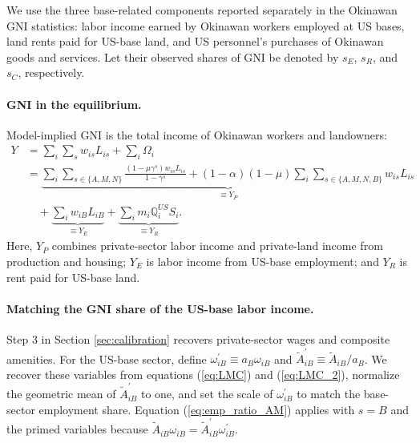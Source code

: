 \documentclass[12pt, unicode, a4paper]{article}
\newcommand{\1}{\mbox{1}\hspace{-0.25em}\mbox{l}} %
\begin{document}
We use the three base-related components reported separately in the Okinawan GNI statistics: labor income earned by Okinawan workers employed at US bases, land rents paid for US-base land, and US personnel's purchases of Okinawan goods and services. Let their observed shares of GNI be denoted by $s_E$, $s_R$, and $s_C$, respectively.

\paragraph{GNI in the equilibrium.}

Model-implied GNI is the total income of Okinawan workers and landowners:
\begin{equation*}
    \begin{split}
    Y &= \sum_i \sum_s w_{is}L_{is}+\sum_i \Omega_i\\
    &= \underbrace{\sum_i \sum_{s \in \{ A,M,N \}} \frac{(1-\mu\gamma^s)w_{is}L_{is}}{1-\gamma^s}+(1-\alpha)(1-\mu)\sum_i \sum_{s \in \{ A,M,N,B \}} w_{is}L_{is}}_{\equiv Y_P}\\
    &\quad +\underbrace{\sum_i w_{iB}L_{iB}}_{\equiv Y_E}+\underbrace{\sum_i m_i\mathbb{Q}_i^{US}S_i}_{\equiv Y_R} .
    \end{split}
\end{equation*}
Here, $Y_P$ combines private-sector labor income and private-land income from production and housing; $Y_E$ is labor income from US-base employment; and $Y_R$ is rent paid for US-base land.

\paragraph{Matching the GNI share of the US-base labor income.}

Step 3 in Section \ref{sec:calibration} recovers private-sector wages and composite amenities. For the US-base sector, define $\omega_{iB}^\prime\equiv a_B\omega_{iB}$ and $\widetilde{A}_{iB}^\prime\equiv\widetilde{A}_{iB}/a_B$. We recover these variables from equations (\ref{eq:LMC}) and (\ref{eq:LMC_2}), normalize the geometric mean of $\widetilde{A}_{iB}^\prime$ to one, and set the scale of $\omega_{iB}^\prime$ to match the base-sector employment share. Equation (\ref{eq:emp_ratio_AM}) applies with $s=B$ and the primed variables because $\widetilde{A}_{iB}\omega_{iB}=\widetilde{A}_{iB}^\prime\omega_{iB}^\prime$.
\end{document}
